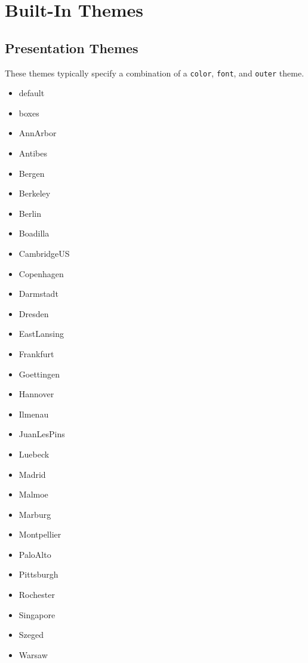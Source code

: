 
\section<1-| beamer:0>{Built-In Themes}\label{sec:builtin-themes}

\subsection{Presentation Themes}\label{subsec:presentation-themes}

These themes typically specify a combination of a \texttt{color}, \texttt{font},  and \texttt{outer} theme.

\ttfamily
\begin{multicols}{4}\raggedcolumns
\begin{itemize}
  \item default
  \item boxes
  \item AnnArbor
  \item Antibes
  \item Bergen
  \item Berkeley
  \item Berlin
  \item Boadilla
  \item CambridgeUS
  \item Copenhagen
  \item Darmstadt
  \item Dresden
  \item EastLansing
  \item Frankfurt
  \item Goettingen
  \item Hannover
  \item Ilmenau
  \item JuanLesPins
  \item Luebeck
  \item Madrid
  \item Malmoe
  \item Marburg
  \item Montpellier
  \item PaloAlto
  \item Pittsburgh
  \item Rochester
  \item Singapore
  \item Szeged
  \item Warsaw
\end{itemize}
\end{multicols}
